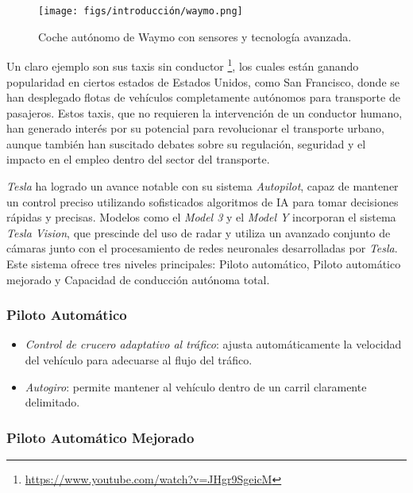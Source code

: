 \begin{figure}[ht]
  \begin{center}
    \texttt{[image: figs/introducción/waymo.png]}
  \end{center}
  \caption{Coche autónomo de Waymo con sensores y tecnología avanzada.}
  \label{waymo}
\end{figure}

Un claro ejemplo son sus taxis sin conductor \footnote{\url{https://www.youtube.com/watch?v=JHgr9SgeicM}}, los cuales están ganando popularidad en ciertos estados de Estados Unidos, como San Francisco, donde  se han desplegado flotas de vehículos completamente autónomos para transporte de pasajeros. Estos taxis, que no requieren la intervención de un conductor humano, han generado interés por su potencial para revolucionar el transporte urbano, aunque también han suscitado debates sobre su regulación, seguridad y el impacto en el empleo dentro del sector del transporte.

\textit{Tesla} ha logrado un avance notable con su sistema \textit{Autopilot}, capaz de mantener un control preciso utilizando sofisticados algoritmos de \ac{IA} para tomar decisiones rápidas y precisas. Modelos como el \textit{Model 3} y el \textit{Model Y} incorporan el sistema \textit{Tesla Vision}, que prescinde del uso de radar y utiliza un avanzado conjunto de cámaras junto con el procesamiento de redes neuronales desarrolladas por \textit{Tesla}. Este sistema ofrece tres niveles principales: Piloto automático, Piloto automático mejorado y Capacidad de conducción autónoma total.

\subsubsection{Piloto Automático}

\begin{itemize}
    \item \textit{Control de crucero adaptativo al tráfico}: ajusta automáticamente la velocidad del vehículo para adecuarse al flujo del tráfico.
    \item \textit{Autogiro}: permite mantener al vehículo dentro de un carril claramente delimitado.
\end{itemize}

\subsubsection{Piloto Automático Mejorado}

